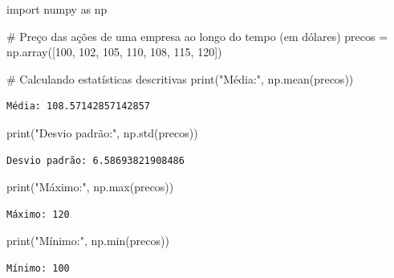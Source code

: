 \documentclass[
  portuguese,
  letterpaper,
  DIV=11,
  numbers=noendperiod]{scrreprt}
\newenvironment{Shaded}{\begin{snugshade}}{\end{snugshade}}
\newcommand{\BuiltInTok}[1]{\textcolor[rgb]{0.00,0.23,0.31}{#1}}
\newcommand{\CommentTok}[1]{\textcolor[rgb]{0.37,0.37,0.37}{#1}}
\newcommand{\DecValTok}[1]{\textcolor[rgb]{0.68,0.00,0.00}{#1}}
\newcommand{\ImportTok}[1]{\textcolor[rgb]{0.00,0.46,0.62}{#1}}
\newcommand{\NormalTok}[1]{\textcolor[rgb]{0.00,0.23,0.31}{#1}}
\newcommand{\OperatorTok}[1]{\textcolor[rgb]{0.37,0.37,0.37}{#1}}
\newcommand{\StringTok}[1]{\textcolor[rgb]{0.13,0.47,0.30}{#1}}
\theoremstyle{definition}
\theoremstyle{remark}
\begin{document}
\begin{Shaded}
\begin{Highlighting}[]
\ImportTok{import}\NormalTok{ numpy }\ImportTok{as}\NormalTok{ np}

\CommentTok{\# Preço das ações de uma empresa ao longo do tempo (em dólares)}
\NormalTok{precos }\OperatorTok{=}\NormalTok{ np.array([}\DecValTok{100}\NormalTok{, }\DecValTok{102}\NormalTok{, }\DecValTok{105}\NormalTok{, }\DecValTok{110}\NormalTok{, }\DecValTok{108}\NormalTok{, }\DecValTok{115}\NormalTok{, }\DecValTok{120}\NormalTok{])}

\CommentTok{\# Calculando estatísticas descritivas}
\BuiltInTok{print}\NormalTok{(}\StringTok{"Média:"}\NormalTok{, np.mean(precos))}
\end{Highlighting}
\end{Shaded}

\begin{verbatim}
Média: 108.57142857142857
\end{verbatim}

\begin{Shaded}
\begin{Highlighting}[]
\BuiltInTok{print}\NormalTok{(}\StringTok{"Desvio padrão:"}\NormalTok{, np.std(precos))}
\end{Highlighting}
\end{Shaded}

\begin{verbatim}
Desvio padrão: 6.58693821908486
\end{verbatim}

\begin{Shaded}
\begin{Highlighting}[]
\BuiltInTok{print}\NormalTok{(}\StringTok{"Máximo:"}\NormalTok{, np.}\BuiltInTok{max}\NormalTok{(precos))}
\end{Highlighting}
\end{Shaded}

\begin{verbatim}
Máximo: 120
\end{verbatim}

\begin{Shaded}
\begin{Highlighting}[]
\BuiltInTok{print}\NormalTok{(}\StringTok{"Mínimo:"}\NormalTok{, np.}\BuiltInTok{min}\NormalTok{(precos))}
\end{Highlighting}
\end{Shaded}

\begin{verbatim}
Mínimo: 100
\end{verbatim}
\end{document}
